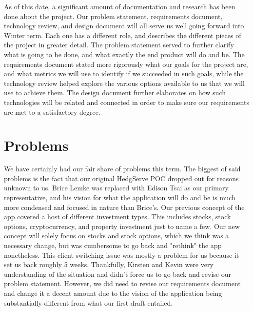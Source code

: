 \documentclass[letterpaper,10pt,titlepage,journal,compsoc,draftclsnofoot,onecolumn]{IEEEtran}
\begin{document}
As of this date, a significant amount of documentation and research has been done about the project. Our problem statement, requirements document, technology review, and design document will all serve us well going forward into Winter term. Each one has a different role, and describes the different pieces of the project in greater detail. The problem statement served to further clarify what is going to be done, and what exactly the end product will do and be. The requirements document stated more rigorously what our goals for the project are, and what metrics we will use to identify if we succeeded in such goals, while the technology review helped explore the various options available to us that we will use to achieve them. The design document further elaborates on how such technologies will be related and connected in order to make sure our requirements are met to a satisfactory degree.

\section{Problems}
We have certainly had our fair share of problems this term. The biggest of said problems is the fact that our original HedgServe POC dropped out for reasons unknown to us. Brice Lemke was replaced with Edison Tsai as our primary representative, and his vision for what the application will do and be is much more condensed and focused in nature than Brice's. Our previous concept of the app covered a host of different investment types. This includes stocks, stock options, cryptocurrency, and property investment just to name a few. Our new concept will solely focus on stocks and stock options, which we think was a necessary change, but was cumbersome to go back and "rethink" the app nonetheless. This client switching issue was mostly a problem for us because it set us back roughly 5 weeks. Thankfully, Kirsten and Kevin were very understanding of the situation and didn't force us to go back and revise our problem statement. However, we did need to revise our requirements document and change it a decent amount due to the vision of the application being substantially different from what our first draft entailed. 
\end{document}
